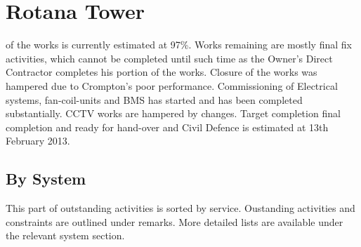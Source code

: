 \chapter{Rotana Tower}

 of the works is currently estimated at 97\%. Works remaining are mostly final fix activities, which cannot be completed until such time as the Owner's Direct Contractor completes his portion of the works.
Closure of the works was hampered due to  Crompton's poor performance. Commissioning of Electrical systems, fan-coil-units and BMS has started and has been completed substantially. CCTV works are hampered by changes. Target completion final completion and ready for hand-over and Civil Defence is estimated at 13th February 2013. 



\section{By System}
This part of outstanding activities is sorted by service. Oustanding activities and constraints are outlined under remarks. More detailed lists are available under the relevant system section.
\bigskip

